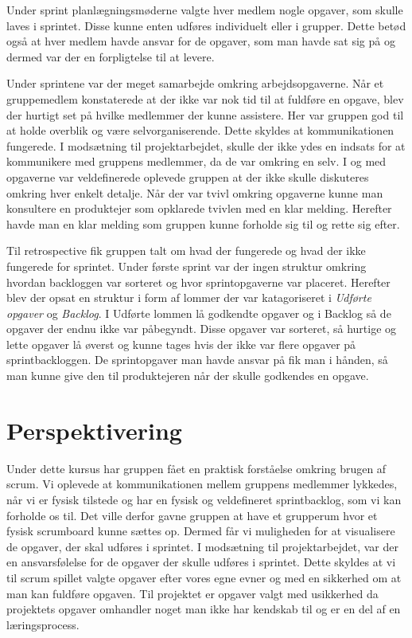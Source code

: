 Under sprint planlægningsmøderne valgte hver medlem nogle opgaver, som skulle laves i sprintet. Disse kunne enten udføres individuelt eller i grupper. Dette betød også at hver medlem havde ansvar for de opgaver, som man havde sat sig på og dermed var der en forpligtelse til at levere. \newline

Under sprintene var der meget samarbejde omkring arbejdsopgaverne. Når et gruppemedlem konstaterede at der ikke var nok tid til at fuldføre en opgave, blev der hurtigt set på hvilke medlemmer der kunne assistere. Her var gruppen god til at holde overblik og være selvorganiserende. Dette skyldes at kommunikationen fungerede. I modsætning til projektarbejdet, skulle der ikke ydes en indsats for at kommunikere med gruppens medlemmer, da de var omkring en selv. 
I og med opgaverne var veldefinerede oplevede gruppen at der ikke skulle diskuteres omkring hver enkelt detalje. Når der var tvivl omkring opgaverne kunne man konsultere en produktejer som opklarede tvivlen med en klar melding. Herefter havde man en klar melding som gruppen kunne forholde sig til og rette sig efter.  \newline

Til retrospective fik gruppen talt om hvad der fungerede og hvad der ikke fungerede for sprintet. Under første sprint var der ingen struktur omkring hvordan backloggen var sorteret og hvor sprintopgaverne var placeret. Herefter blev der opsat en struktur i form af lommer der var katagoriseret i \textit{Udførte opgaver} og \textit{Backlog}. I Udførte lommen lå godkendte opgaver og i Backlog så de opgaver der endnu ikke var påbegyndt. Disse opgaver var sorteret, så hurtige og lette opgaver lå øverst og kunne tages hvis der ikke var flere opgaver på sprintbackloggen. De sprintopgaver man havde ansvar på fik man i hånden, så man kunne give den til produktejeren når der skulle godkendes en opgave. \newline

\section{Perspektivering}
Under dette kursus har gruppen fået en praktisk forståelse omkring brugen af scrum. Vi oplevede at kommunikationen mellem gruppens medlemmer lykkedes, når vi er fysisk tilstede og har en fysisk og veldefineret sprintbacklog, som vi kan forholde os til. Det ville derfor gavne gruppen at have et grupperum hvor et fysisk scrumboard kunne sættes op. Dermed får vi muligheden for at visualisere de opgaver, der skal udføres i sprintet. \newline
I modsætning til projektarbejdet, var der en ansvarsfølelse for de opgaver der skulle udføres i sprintet. Dette skyldes at vi til scrum spillet valgte opgaver efter vores egne evner og med en sikkerhed om at man kan fuldføre opgaven. Til projektet er opgaver valgt med usikkerhed da projektets opgaver omhandler noget man ikke har kendskab til og er en del af en læringsprocess.

